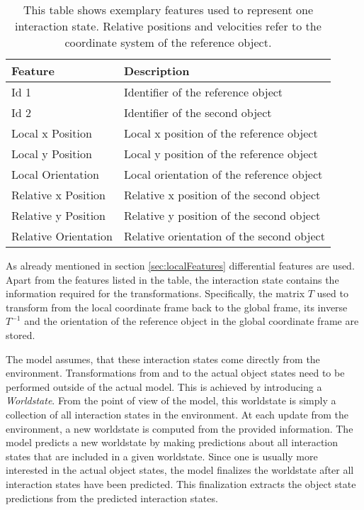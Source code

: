 \begin{table}
	\centering
	\begin{tabular*}{\textwidth}{@{\extracolsep{\fill} } l l}
		\textbf{Feature} & \textbf{Description} \\ 
		\hline \hline 
		 Id 1 & Identifier of the reference object \\ 
		 Id 2 & Identifier of the second object \\ 
		 Local x Position & Local x position of the reference object \\
		 Local y Position & Local y position of the reference object \\
		 Local Orientation & Local orientation of the reference object \\
		 Relative x Position & Relative x position of the second object \\
		 Relative y Position & Relative y position of the second object \\
		 Relative Orientation & Relative orientation of the second object \\
		\hline 
	\end{tabular*} 
	\caption{This table shows exemplary features used to represent one interaction state. Relative positions and velocities refer to the coordinate system of the reference object.}
	\label{tab:pairInteractionFeatures}
\end{table}

As already mentioned in section \ref{sec:localFeatures} differential features are used. Apart from the features listed in the table, the interaction state contains the information required for the transformations. Specifically, the matrix $T$ used to transform from the local coordinate frame back to the global frame, its inverse $T^{-1}$ and the orientation of the reference object in the global coordinate frame are stored.

The model assumes, that these interaction states come directly from the environment. Transformations from and to the actual object states need to be performed outside of the actual model. This is achieved by introducing a \textit{Worldstate}. From the point of view of the model, this worldstate is simply a collection of all interaction states in the environment. At each update from the environment, a new worldstate is computed from the provided information. The model predicts a new worldstate by making predictions about all interaction states that are included in a given worldstate. Since one is usually more interested in the actual object states, the model finalizes the worldstate after all interaction states have been predicted. This finalization extracts the object state predictions from the predicted interaction states. 

